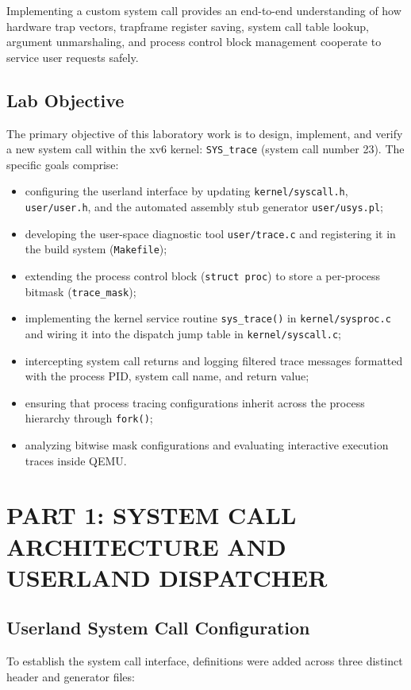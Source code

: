 \documentclass[12pt,a4paper]{report}
\numberwithin{equation}{chapter}
\numberwithin{figure}{chapter}
\numberwithin{table}{chapter}
\begin{document}
Implementing a custom system call provides an end-to-end understanding of how hardware trap vectors, trapframe register saving, system call table lookup, argument unmarshaling, and process control block management cooperate to service user requests safely.

\section{Lab Objective}
The primary objective of this laboratory work is to design, implement, and verify a new system call within the xv6 kernel: \texttt{SYS\_trace} (system call number 23). The specific goals comprise:
\begin{itemize}
    \item configuring the userland interface by updating \texttt{kernel/syscall.h}, \texttt{user/user.h}, and the automated assembly stub generator \texttt{user/usys.pl};
    \item developing the user-space diagnostic tool \texttt{user/trace.c} and registering it in the build system (\texttt{Makefile});
    \item extending the process control block (\texttt{struct proc}) to store a per-process bitmask (\texttt{trace\_mask});
    \item implementing the kernel service routine \texttt{sys\_trace()} in \texttt{kernel/sysproc.c} and wiring it into the dispatch jump table in \texttt{kernel/syscall.c};
    \item intercepting system call returns and logging filtered trace messages formatted with the process PID, system call name, and return value;
    \item ensuring that process tracing configurations inherit across the process hierarchy through \texttt{fork()};
    \item analyzing bitwise mask configurations and evaluating interactive execution traces inside QEMU.
\end{itemize}

\chapter{PART 1: SYSTEM CALL ARCHITECTURE AND USERLAND DISPATCHER}

\section{Userland System Call Configuration}
To establish the system call interface, definitions were added across three distinct header and generator files:
\end{document}
